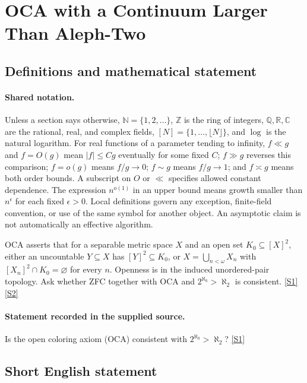 \documentclass[11pt,a4paper]{article}
\newcommand{\N}{\mathbb{N}}
\newcommand{\Z}{\mathbb{Z}}
\newcommand{\Q}{\mathbb{Q}}
\newcommand{\R}{\mathbb{R}}
\newcommand{\C}{\mathbb{C}}
\newcommand{\sref}[2]{\hyperlink{source:#1:#2}{[S#2]}}
\begin{document}
\section{OCA with a Continuum Larger Than Aleph-Two}\label{statement}


\subsection{Definitions and mathematical statement}

\paragraph{Shared notation.}Unless a section says otherwise, $\N=\{1,2,\ldots\}$,
$\Z$ is the ring of integers, $\Q,\R,\C$ are the rational, real, and complex
fields, $[N]=\{1,\ldots,\lfloor N\rfloor\}$, and $\log$ is the natural
logarithm. For real functions of a parameter tending to infinity,
$f\ll g$ and $f=O(g)$ mean $|f|\leq Cg$ eventually for some fixed $C$;
$f\gg g$ reverses this comparison; $f=o(g)$ means $f/g\to0$;
$f\sim g$ means $f/g\to1$; and $f\asymp g$ means both order bounds.
A subscript on $O$ or $\ll$ specifies allowed constant dependence.
The expression $n^{o(1)}$ in an upper bound means growth smaller than
$n^\epsilon$ for each fixed $\epsilon>0$. Local definitions govern any
exception, finite-field convention, or use of the same symbol for another
object. An asymptotic claim is not automatically an effective algorithm.



OCA asserts that for a separable metric space $X$ and an open set $K_0\subseteq[X]^2$, either an uncountable $Y\subseteq X$ has $[Y]^2\subseteq K_0$, or $X=\bigcup_{n<\omega}X_n$ with $[X_n]^2\cap K_0=\varnothing$ for every $n$. Openness is in the induced unordered-pair topology. Ask whether ZFC together with OCA and $2^{\aleph_0}>\aleph_2$ is consistent. \sref{statement}{1} \sref{statement}{2}

\paragraph{Statement recorded in the supplied source.}
Is the open coloring axiom (OCA) consistent with $2^{\aleph_0} > \aleph_2$? \sref{statement}{1}

\subsection{Short English statement}
\end{document}
